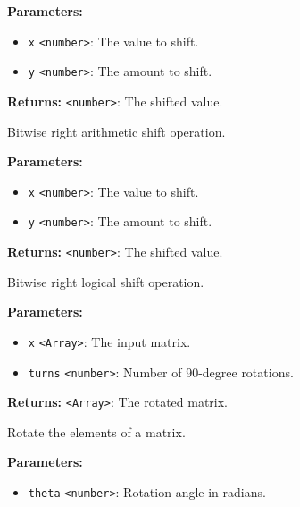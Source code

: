 \documentclass[12pt,a4paper]{article}
\begin{document}
\noindent \textbf{Parameters:}
\begin{itemize}
  \item \texttt{x} \texttt{<number>}: The value to shift.
  \item \texttt{y} \texttt{<number>}: The amount to shift.
\end{itemize}

\noindent \textbf{Returns:} \texttt{<number>}: The shifted value.

\noindent Bitwise right arithmetic shift operation.

\vspace{5mm}
\noindent {}


\noindent \textbf{Parameters:}
\begin{itemize}
  \item \texttt{x} \texttt{<number>}: The value to shift.
  \item \texttt{y} \texttt{<number>}: The amount to shift.
\end{itemize}

\noindent \textbf{Returns:} \texttt{<number>}: The shifted value.

\noindent Bitwise right logical shift operation.

\vspace{5mm}
\noindent {}


\noindent \textbf{Parameters:}
\begin{itemize}
  \item \texttt{x} \texttt{<Array>}: The input matrix.
  \item \texttt{turns} \texttt{<number>}: Number of 90-degree rotations.
\end{itemize}

\noindent \textbf{Returns:} \texttt{<Array>}: The rotated matrix.

\noindent Rotate the elements of a matrix.

\vspace{5mm}
\noindent {}


\noindent \textbf{Parameters:}
\begin{itemize}
  \item \texttt{theta} \texttt{<number>}: Rotation angle in radians.
\end{itemize}
\end{document}
